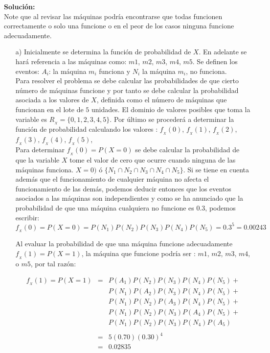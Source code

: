 \documentclass[base=hide,12pt]{elegantbook}
\begin{document}
\textcolor{col3}{\bf Solución:}\\
Note que al revisar las máquinas podría encontrarse que todas funcionen correctamente o solo una funcione o en el peor de los casos ninguna funcione adecuadamente.
\begin{itemize}
\item[a)] Inicialmente se determina la función de probabilidad de $X$. En adelante se hará referencia a las máquinas como: $m1$, $m2$, $m3$, $m4$, $m5$. Se definen los eventos: $A_{i}$: la máquina $m_{i}$ funciona y $N_{i}$ la máquina $m_{i}$, no funciona.\\
	
Para resolver el problema se debe calcular las probabilidades de que cierto número de máquinas funcione y por tanto se debe calcular la probabilidad asociada a los valores de $X$, definida como el número de máquinas que funcionan en el lote de $5$ unidades. El dominio de valores posibles que toma la variable es $R_{_{X}}=\{0,1,2,3,4,5\}$. Por último se procederá a determinar la función de probabilidad calculando los valores : $f_{_{X}}(0)$, $f_{_{X}}(1)$, $f_{_{X}}(2)$, $f_{_{X}}(3)$, $f_{_{X}}(4)$, $f_{_{X}}(5)$,\\
				
Para determinar $f_{_{X}}(0)=P(X=0)$ se debe calcular la probabilidad de que la variable $X$ tome el  valor de cero que ocurre cuando ninguna de las máquinas funciona. $X=0)$ ó $\{ N_{1} \cap N_{2} \cap N_{3} \cap N_{4} \cap N_{5} \}$. Si se tiene en cuenta además que el funcionamiento de cualquier máquina no afecta el funcionamiento de las demás, podemos deducir entonces que los eventos asociados a las máquinas son independientes y como se ha anunciado que la probabilidad de que una máquina cualquiera no funcione es 
$0.3$, podemos escribir: \\
	
$$f_{_{X}}(0) = P(X=0) = P(N_{1}) P(N_{2}) P(N_{3}) P(N_{4})  P(N_{5}) =  0.3^{5} = 0.00243$$
		
Al evaluar la probabilidad de que una máquina funcione adecuadamente $f_{_{X}}(1) = P(X=1)$, la máquina que funcione podría ser : $m1$, $m2$, $m3$, $m4$, o $m5$, por tal razón:
	
	
\begin{eqnarray*}
		f_{_{X}}(1) =P(X=1)&=& P(A_{1})P(N_{2})P(N_{3})P(N_{4})P(N_{5}) +\\
		                     &&  P(N_1)P(A_{2})P(N_{3})P(N_{4})P(N_{5}) +\\  
	                      	&& P(N_{1})P(N_{2})P(A_{3})P(N_{4})P(N_{5}) + \\ 
		                     &&  P(N_{1})P(N_{2})P(N_{3})P(A_{4})P(N_{5}) +\\  
	                    	&&P(N_{1})P(N_{2})P(N_{3})P(N_{4})P(A_{5})\\
	                    	&&\\
	                   	&=&  5 (0.70) (0.30)^{4} \\
		               &=&	0.02835\\
\end{eqnarray*}
	

\end{itemize}
\end{document}
